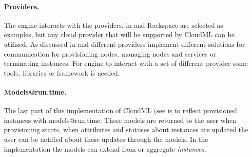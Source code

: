 \paragraph{Providers.}

The engine interacts with the providers, in  
 and Rackspace are selected as examples, but any
cloud provider that will be supported by CloudML can be utilized.
As discussed in  and 
different providers implement different solutions for communication
\eg for provisioning nodes, managing nodes and services or terminating instances.
For engine to interact with a set of different provider some tools, libraries
or framework is needed.

\paragraph{Models@run.time.}

The last part of this implementation of CloudML (see  is to
reflect provisioned instances with models@run.time.
These models are returned to the user when provisioning starts, when
attributes and statuses about instances are updated the user can be 
notified about these updates through the models.
In the implementation the models can extend from or aggregate \emph{instances}.
